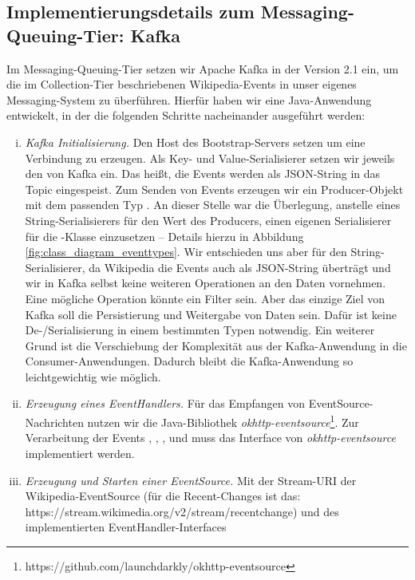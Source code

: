 \subsection{Implementierungsdetails zum Messaging-Queuing-Tier: Kafka}
Im Messaging-Queuing-Tier setzen wir Apache Kafka in der Version 2.1 ein, um die im Collection-Tier beschriebenen Wikipedia-Events
in unser eigenes Messaging-System zu überführen. Hierfür haben wir eine Java-Anwendung entwickelt, in der die folgenden
Schritte nacheinander ausgeführt werden:
\begin{enumerate}[i.]
    \item \textit{Kafka Initialisierung.} Den Host des Bootstrap-Servers setzen um eine Verbindung zu erzeugen.
    Als Key- und Value-Serialisierer setzen wir
    jeweils den  von Kafka ein. Das heißt, die Events werden als JSON-String in das Topic 
    eingespeist. Zum Senden von Events erzeugen wir ein Producer-Objekt mit dem passenden Typ .
    An dieser Stelle war die Überlegung, anstelle eines String-Serialisierers für den Wert des Producers,
    einen eigenen Serialisierer für die -Klasse einzusetzen -- Details hierzu in Abbildung \ref{fig:class_diagram_eventtypes}. Wir entschieden uns aber für den
    String-Serialisierer, da Wikipedia die Events auch als JSON-String überträgt und wir in Kafka selbst
    keine weiteren Operationen an den Daten vornehmen. Eine mögliche Operation könnte ein Filter sein.
    Aber das einzige Ziel von Kafka soll die Persistierung und Weitergabe von Daten sein. Dafür ist keine De-/Serialisierung in
    einem bestimmten Typen notwendig. Ein weiterer Grund ist die Verschiebung der Komplexität aus der Kafka-Anwendung
    in die Consumer-Anwendungen. Dadurch bleibt die Kafka-Anwendung so leichtgewichtig wie möglich.
    \item \textit{Erzeugung eines EventHandlers.} Für das Empfangen von EventSource-Nachrichten nutzen wir die Java-Bibliothek
    \textit{okhttp-eventsource}\footnote{https://github.com/launchdarkly/okhttp-eventsource}. Zur Verarbeitung der Events
    , , ,  und  muss das Interface  von
    \textit{okhttp-eventsource} implementiert werden.
    \item \textit{Erzeugung und Starten einer EventSource.} Mit der Stream-URI der Wikipedia-EventSource (für die Recent-Changes ist das: https://stream.wikimedia.org/v2/stream/recentchange)
    und des implementierten EventHandler-Interfaces

\end{enumerate}
